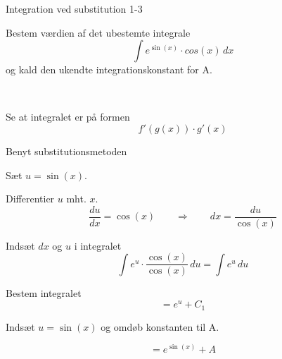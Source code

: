 \documentclass{article}
\begin{document}
\begin{exercise}{Integration ved substitution 1-3}
	
	
	Bestem værdien af det ubestemte integrale
	\[
	\int e^{\sin(x)} \cdot cos(x) \, dx
	\]
	og kald den ukendte integrationskonstant for A.
	
	 \\
	
	
	
	\hint
	
	Se at integralet er på formen
	\[
	f'(g(x)) \cdot g'(x)
	\]
	
	\hint
	
	Benyt substitutionsmetoden
	
	\hint
	
	Sæt $u=\sin(x)$.
	
	
	\hint
	
	Differentier $u$ mht. $x$.
	\[
	\frac{du}{dx} = \cos(x) \qquad	\Rightarrow \qquad dx = \frac{du}{\cos(x)}
	\]
	
	\hint
	
	Indsæt $dx$ og $u$ i integralet
	\[
	\int e^{u} \cdot \frac{\cos(x)}{\cos(x)} \, du = \int e^u \, du
	\]
	
	\hint
	
	Bestem integralet
	\[
	=  e^{u} + C_1
	\]
	
	\hint
	
	Indsæt $u = \sin(x)$ og omdøb konstanten  til A.
	
	\hint
	
	\[
	= e^{\sin(x)} + A
	\]
	
	
\end{exercise}

\newpage
\end{document}

